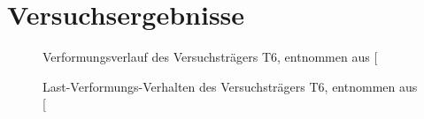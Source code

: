 \documentclass[
  11pt,
  letterpaper,
]{scrreprt}
\begin{document}
\section{Versuchsergebnisse}\label{versuchsergebnisse}

\begin{figure}[H]


\caption{\label{fig-durchbiegung_laengs_t6}Verformungsverlauf des
Versuchsträgers T6, entnommen aus
{[}\citeproc{ref-sigrist_versuche_1993}{5}{]}}

\end{figure}%

\begin{figure}[H]


\caption{\label{fig-durchbiegung_t6}Last-Verformungs-Verhalten des
Versuchsträgers T6, entnommen aus
{[}\citeproc{ref-sigrist_versuche_1993}{5}{]}}

\end{figure}%
\end{document}
